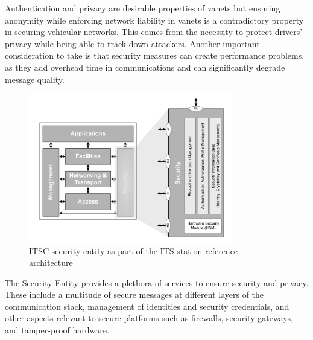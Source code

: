 Authentication and privacy are desirable properties of \glspl{vanet} but ensuring anonymity while enforcing network liability in \glspl{vanet} is a contradictory property in securing vehicular networks. This comes from the necessity to protect drivers' privacy while being able to track down attackers. \cite{jiang_ieee_2008} \cite{malhi_security_2020}
Another important consideration to take is that security measures can create performance problems, as they add overhead time in communications and can significantly degrade message quality. \cite{toor_vehicle_2008}
\cite{etsi_intelligent_2010-1}


\begin{figure}[htbp]
    \centering
    \includegraphics[width=0.8\textwidth]{Chapters/Figures/VANETs/security_entity.png}
   	\caption{ITSC security entity as part of the ITS station reference architecture~\cite{etsi_intelligent_2010}}
   	\label{fig:security_entity}
\end{figure}


The Security Entity provides a plethora of services to ensure security and privacy. These include a multitude of secure messages at different layers of the communication stack, management of identities and security credentials, and other aspects relevant to secure platforms such as firewalls, security gateways, and tamper-proof hardware.
\cite{etsi_intelligent_2014}

